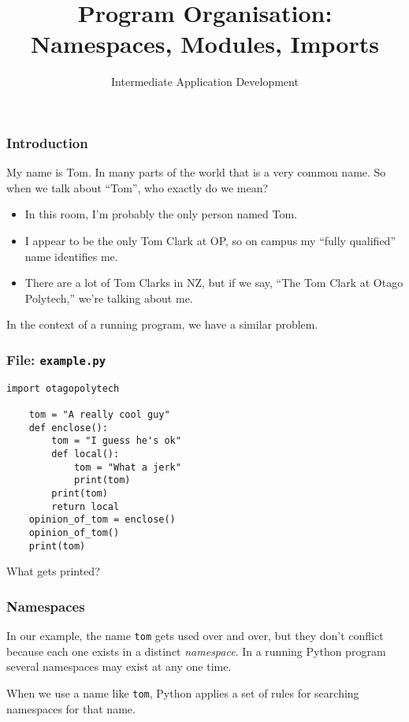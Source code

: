 \documentclass[10pt]{beamer}
\title{Program Organisation: \\ Namespaces, Modules, Imports}
\author[IN608]{Intermediate Application Development}
\institute[Otago Polytechnic]{
  Otago Polytechnic \\
  Dunedin, New Zealand \\
  Kaiako: Tom Clark
}
\date{}
\begin{document}
\begin{frame}[plain]
  \titlepage
\end{frame}

\begin{frame}
  \frametitle{Introduction}
  
  My name is Tom. In many parts of the world that is a very common name.
  So when we talk about ``Tom'', who exactly do we mean?
  
  \begin{itemize}
    \item In this room, I'm probably the only person named Tom.
    \item I appear to be the only Tom Clark at OP, so on campus my ``fully qualified'' name identifies me.
    \item There are a lot of Tom Clarks in NZ, but if we say, ``The Tom Clark at Otago Polytech,'' we're talking about 
    me.
  \end{itemize}
  
  \vspace{5mm}
  In the context of a running program, we have a similar problem.         
\end{frame}

\begin{frame}[fragile]
  \frametitle{File: \texttt{example.py}}

  \begin{Verbatim}[commandchars=\\\{\}]
    import otagopolytech
    
    tom = "A really cool guy"
    def enclose():
        tom = "I guess he's ok"
        def local():
            tom = "What a jerk"
            print(tom)
        print(tom)
        return local        
    opinion_of_tom = enclose()
    opinion_of_tom()   
    print(tom)
  \end{Verbatim}
  What gets printed?
\end{frame}

\begin{frame}
  \frametitle{Namespaces}
  
  In our example, the name \texttt{tom} gets used over and over, but they don't 
  conflict because each one exists in a distinct \emph{namespace}. In a running 
  Python program several namespaces may exist at any one time.
  
  \vspace{5mm}
  When we use a name like \texttt{tom}, Python applies a set of rules for searching 
  namespaces for that name.
  
     
\end{frame}
\end{document}

